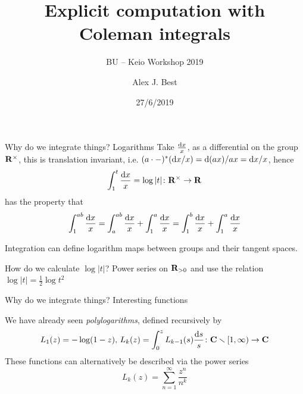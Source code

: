 \DeclareMathOperator{\rank}{rank}
\newcommand{\sheaf}[1]{\operatorname{\mathcal{#1}}}
\DeclareMathOperator{\Jac}{Jac}
\newcommand{\inv}{^{-1}}
\DeclareMathOperator{\norm}{Nm}
\DeclareMathOperator{\ord}{ord}
\DeclareMathOperator{\divisor}{div}
\DeclareMathOperator{\PP}{\mathbf{P}}
\DeclareMathOperator{\Hom}{Hom}
\DeclareMathOperator{\Mat}{Mat}
\DeclareMathOperator{\End}{End}

\newcommand{\lb}{[}
\newcommand{\rb}{]}


\author{Alex J. Best}
\date{27/6/2019}
\title{Explicit computation with Coleman integrals}
\subtitle{BU -- Keio Workshop 2019}



\begin{frame}
  \titlepage

\end{frame}


\begin{frame}{Why do we integrate things? Logarithms}
    Take \( \frac{\mathop{}\!\mathrm{d} x}{x}\), as a differential on the group \( \mathbf R^\times \), \pause
    this is translation invariant, i.e. $(a\cdot - )^*(\mathop{}\!\mathrm{d} x/x)= \mathop{}\!\mathrm{d}(ax)/ax = \mathop{}\!\mathrm{d} x/ x$\pause, hence
    \[
        \int_1^t \frac{\mathop{}\!\mathrm{d} x}x = \log |t| \colon \mathbf R^\times \to \mathbf R
    \]
    has the property that
    \[
        \int_1^{ab} \frac{\mathop{}\!\mathrm{d} x}x = \int_a^{ab} \frac{\mathop{}\!\mathrm{d} x}{x} + \int_1^a \frac{\mathop{}\!\mathrm{d} x}{x} = \int_1^b \frac{\mathop{}\!\mathrm{d} x}{x}  + \int_1^a \frac{\mathop{}\!\mathrm{d} x}{x}
    \]

    Integration can define logarithm maps between groups and their tangent spaces.

    How do we calculate $\log |t|$? Power series on $\mathbf R_{> 0}$ and use the relation $\log|t| = \frac 12 \log t^2$

\end{frame}

\begin{frame}{Why do we integrate things? Interesting functions}

    We have already seen \emph{polylogarithms}, defined recursively by%
    \[
        L_1(z) = -\log(1-z),\,L_k(z)  = \int_0^z L_{k-1}(s)\frac{\mathop{}\!\mathrm{d} s}{s} \colon \mathbf C\smallsetminus [1,\infty) \to \mathbf C
    \]\pause
    These functions can alternatively be described via the power series
    \[
        L_k(z) = \sum_{n=1}^\infty \frac{z^n}{n^k}
    \]

\end{frame}

